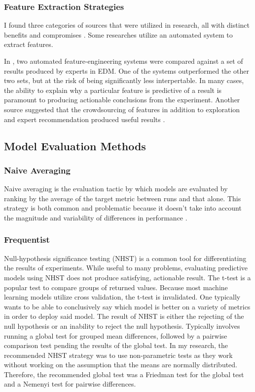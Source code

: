 \documentclass{article}
\begin{document}
        \subsubsection{Feature Extraction Strategies}
            I found three categories of sources that were utilized in research, all with distinct benefits and compromises \cite{automl2021,towards2014}.
            Some researches utilize an automated system to extract features.
            
            In \cite{automl2021}, two automated feature-engineering systems were compared against a set of results produced by experts in EDM.
            One of the systems outperformed the other two sets, but at the risk of being significantly less interpertable.
            In many cases, the ability to explain why a particular feature is predictive of a result is paramount to producing actionable conclusions from the experiment.
            Another source suggested that the crowdsourcing of features in addition to exploration and expert recommendation produced useful results \cite{towards2014}.
                
    \subsection{Model Evaluation Methods}
        \subsubsection{Naive Averaging}
            Naive averaging is the evaluation tactic by which models are evaluated by ranking by the average of the target metric between runs and that alone. 
            This strategy is both common and problematic because it doesn't take into account the magnitude and variability of differences in performance \cite{eval2018}.

        \subsubsection{Frequentist}
            Null-hypothesis significance testing (NHST) is a common tool for differentiating the results of experiments.
            While useful to many problems, evaluating predictive models using NHST does not produce satisfying, actionable result.
            The t-test is a popular test to compare groups of returned values. 
            Because most machine learning models utilize cross validation, the t-test is invalidated.
            One typically wants to be able to conclusively say which model is better on a variety of metrics in order to deploy said model.
            The result of NHST is either the rejecting of the null hypothesis or an inability to reject the null hypothesis.
            Typically involves running a global test for grouped mean differences, followed by a pairwise comparison test pending the results of the global test.
            In my research, the recommended NHST strategy was to use non-parametric tests as they work without working on the assumption that the means are normally distributed. 
            Therefore, the recommended global test was a Friedman test for the global test and a Nemenyi test for pairwise differences.
        
\end{document}
